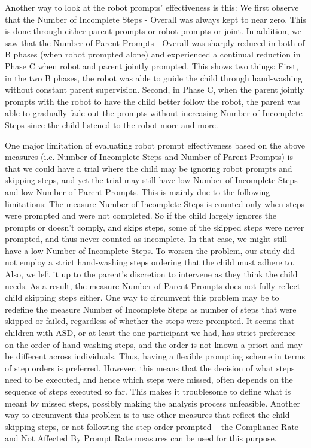Another way to look at the robot prompts' effectiveness is this: We first observe that the Number of Incomplete Steps - Overall was always kept to near zero.  This is done through either parent prompts or robot prompts or joint.  In addition, we saw that the Number of Parent Prompts - Overall was sharply reduced in both of B phases (when robot prompted alone) and experienced a continual reduction in Phase C when robot and parent jointly prompted.  This shows two things: First, in the two B phases, the robot was able to guide the child through hand-washing without constant parent supervision.  Second, in Phase C, when the parent jointly prompts with the robot to have the child better follow the robot, the parent was able to gradually fade out the prompts without increasing Number of Incomplete Steps since the child listened to the robot more and more.

One major limitation of evaluating robot prompt effectiveness based on the above measures (i.e. Number of Incomplete Steps and Number of Parent Prompts) is that we could have a trial where the child may be ignoring robot prompts and skipping steps, and yet the trial may still have low Number of Incomplete Steps and low Number of Parent Prompts.  This is mainly due to the following limitations: The measure Number of Incomplete Steps is counted only when steps were prompted and were not completed.  So if the child largely ignores the prompts or doesn't comply, and skips steps, some of the skipped steps were never prompted, and thus never counted as incomplete.  In that case, we might still have a low Number of Incomplete Steps.  To worsen the problem, our study did not employ a strict hand-washing steps ordering that the child must adhere to.  Also, we left it up to the parent's discretion to intervene as they think the child needs.  As a result, the measure Number of Parent Prompts does not fully reflect child skipping steps either.  One way to circumvent this problem may be to redefine the measure Number of Incomplete Steps as number of steps that were skipped or failed, regardless of whether the steps were prompted.  It seems that children with ASD, or at least the one participant we had, has strict preference on the order of hand-washing steps, and the order is not known a priori and may be different across individuals.  Thus, having a flexible prompting scheme in terms of step orders is preferred.  However, this means that the decision of what steps need to be executed, and hence which steps were missed, often depends on the sequence of steps executed so far.  This makes it troublesome to define what is meant by missed steps, possibly making the analysis process unfeasible.  Another way to circumvent this problem is to use other measures that reflect the child skipping steps, or not following the step order prompted -- the Compliance Rate and Not Affected By Prompt Rate measures can be used for this purpose.

